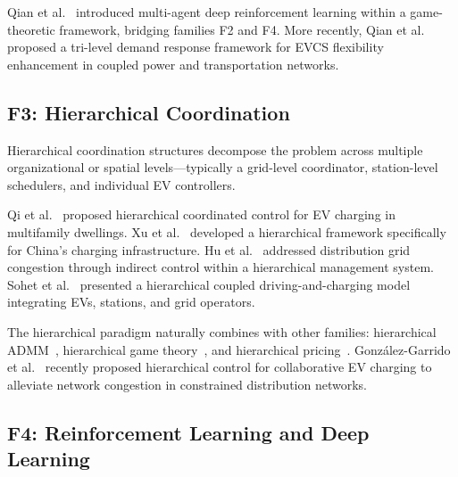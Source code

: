 \documentclass[review]{elsarticle}
\begin{document}
\hspace{0.5cm}Qian et al.~\cite{qian2022multiagent} introduced multi-agent deep reinforcement learning within a game-theoretic framework, bridging families F2 and F4. More recently, Qian et al.~\cite{qian2025trilevel} proposed a tri-level demand response framework for EVCS flexibility enhancement in coupled power and transportation networks.


\subsection{F3: Hierarchical Coordination}\label{sec:f3}

\hspace{0.5cm}Hierarchical coordination structures decompose the problem across multiple organizational or spatial levels---typically a grid-level coordinator, station-level schedulers, and individual EV controllers.

\hspace{0.5cm}Qi et al.~\cite{qi2014hierarchical} proposed hierarchical coordinated control for EV charging in multifamily dwellings. Xu et al.~\cite{xu2016hierarchical} developed a hierarchical framework specifically for China's charging infrastructure. Hu et al.~\cite{hu2016preventing} addressed distribution grid congestion through indirect control within a hierarchical management system. Sohet et al.~\cite{sohet2021hierarchical} presented a hierarchical coupled driving-and-charging model integrating EVs, stations, and grid operators.

\hspace{0.5cm}The hierarchical paradigm naturally combines with other families: hierarchical ADMM~\cite{khaki2018hierarchical}, hierarchical game theory~\cite{shakerighadi2018hierarchical,zhao2018realtime}, and hierarchical pricing~\cite{meng2024distributed}. Gonz\'alez-Garrido et al.~\cite{gonzalez2024hierarchical} recently proposed hierarchical control for collaborative EV charging to alleviate network congestion in constrained distribution networks.


\subsection{F4: Reinforcement Learning and Deep Learning}\label{sec:f4}
\end{document}
